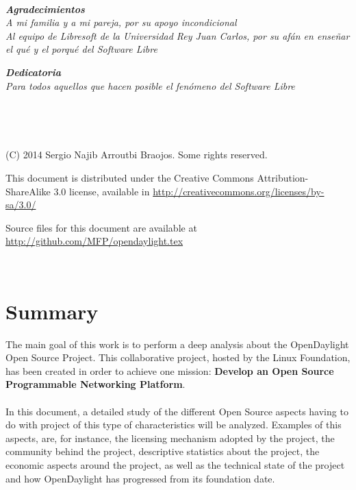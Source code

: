 \documentclass[a4paper, 12pt]{book}
\begin{document}
\newpage
~
\thispagestyle{empty}
\vspace{3cm}
\begin{flushright}
\textbf{\textit{Agradecimientos}} \\
\textit{A mi familia y a mi pareja, por su apoyo incondicional\\
Al equipo de Libresoft de la Universidad Rey Juan Carlos,
por su afán en enseñar el qué y el porqué del Software Libre}
\vspace{2cm}

\textbf{\textit{Dedicatoria}} \\
\textit{Para todos aquellos que hacen posible el fenómeno del Software Libre}
\end{flushright}

\newpage
~


\newpage
~
\thispagestyle{empty}
\vspace{12cm}
\begin{flushright}

(C) 2014 Sergio Najib Arroutbi Braojos. Some rights reserved.

This document is distributed under the Creative Commons
Attribution-ShareAlike 3.0 license,
available in \url{http://creativecommons.org/licenses/by-sa/3.0/}

Source files for this document are available at
\url{http://github.com/MFP/opendaylight.tex}
\end{flushright}

\newpage
~

\tableofcontents

\listoffigures

\listoftables


\chapter*{Summary}
\label{chap:summary}

The main goal of this work is to perform a deep analysis about the OpenDaylight Open Source Project. This collaborative project, hosted by the Linux Foundation, has been created in order to achieve one mission: \textbf{Develop an Open Source Programmable Networking Platform}.\\
\\
In this document, a detailed study of the different Open Source aspects having to do with project of this type of characteristics will be analyzed. Examples of this aspects, are, for instance, the licensing mechanism adopted by the project, the community behind the project, descriptive statistics about the project, the economic aspects around the project, as well as the technical state of the project and how OpenDaylight has progressed from its foundation date.
\end{document}
